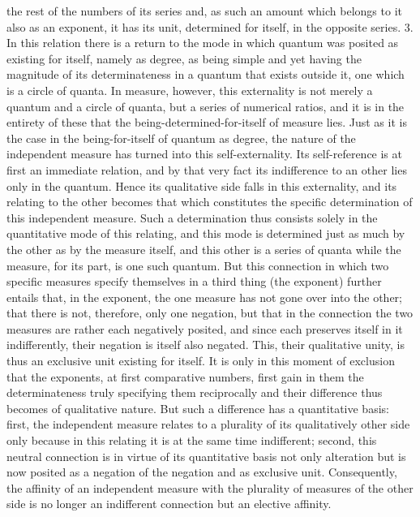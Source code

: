 the rest of the numbers of its series and, as such an amount which belongs
to it also as an exponent, it has its unit, determined for itself, in the opposite
series.
3. In this relation there is a return to the mode in which quantum was
posited as existing for itself, namely as degree, as being simple and yet having
the magnitude of its determinateness in a quantum that exists outside it,
one which is a circle of quanta. In measure, however, this externality is not
merely a quantum and a circle of quanta, but a series of numerical ratios, and
it is in the entirety of these that the being-determined-for-itself of measure
lies. Just as it is the case in the being-for-itself of quantum as degree, the
nature of the independent measure has turned into this self-externality.
Its self-reference is at first an immediate relation, and by that very fact its
indifference to an other lies only in the quantum. Hence its qualitative
side falls in this externality, and its relating to the other becomes that which
constitutes the specific determination of this independent measure. Such a
determination thus consists solely in the quantitative mode of this relating,
and this mode is determined just as much by the other as by the measure
itself, and this other is a series of quanta while the measure, for its part,
is one such quantum. But this connection in which two specific measures
specify themselves in a third thing (the exponent) further entails that, in
the exponent, the one measure has not gone over into the other; that there
is not, therefore, only one negation, but that in the connection the two
measures are rather each negatively posited, and since each preserves itself
in it indifferently, their negation is itself also negated. This, their qualitative
unity, is thus an exclusive unit existing for itself. It is only in this moment
of exclusion that the exponents, at first comparative numbers, first gain
in them the determinateness truly specifying them reciprocally and their
difference thus becomes of qualitative nature. But such a difference has a
quantitative basis: first, the independent measure relates to a plurality of its
qualitatively other side only because in this relating it is at the same time
indifferent; second, this neutral connection is in virtue of its quantitative
basis not only alteration but is now posited as a negation of the negation
and as exclusive unit. Consequently, the affinity of an independent measure
with the plurality of measures of the other side is no longer an indifferent
connection but an elective affinity.

